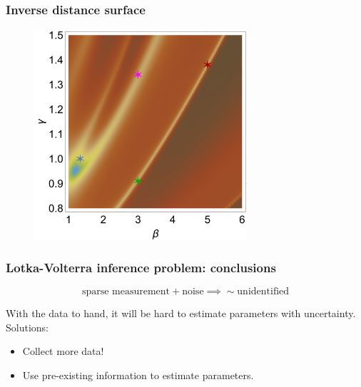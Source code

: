 \documentclass[handout]{beamer}
\begin{document}
\begin{frame}
	\frametitle{Inverse distance surface}
	
	\begin{figure}[ht]
		\centerline{\includegraphics[width=0.7\textwidth]{./figures/lotka-volterra-inference-big.png}}
	\end{figure}
	
\end{frame}

\begin{frame}
	\frametitle{Lotka-Volterra inference problem: conclusions}
	
	\begin{equation}
	\text{sparse measurement} + \text{noise} \implies \sim \text{unidentified}
	\end{equation}
	
	With the data to hand, it will be hard to estimate parameters with uncertainty. Solutions:
	
	\begin{itemize}
		\item Collect more data!
		\item Use pre-existing information to estimate parameters.
	\end{itemize}
	
\end{frame}
\end{document}
